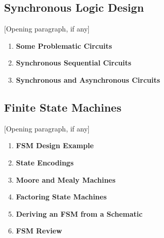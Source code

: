 \documentclass[12pt]{article}
\begin{document}
\subsection{Synchronous Logic Design}

[Opening paragraph, if any]

\begin{enumerate}
    \item \textbf{Some Problematic Circuits}

    \item \textbf{Synchronous Sequential Circuits}

    \item \textbf{Synchronous and Asynchronous Circuits}
\end{enumerate}

\subsection{Finite State Machines}

[Opening paragraph, if any]

\begin{enumerate}
    \item \textbf{FSM Design Example}

    \item \textbf{State Encodings}

    \item \textbf{Moore and Mealy Machines}


    \item \textbf{Factoring State Machines}

    \item \textbf{Deriving an FSM from a Schematic}

    \item \textbf{FSM Review}
\end{enumerate}
\end{document}
